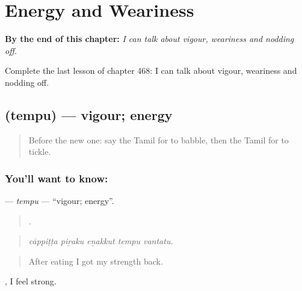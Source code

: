 
\chapter{Energy and Weariness}
\label{ch:ta-energy-and-weariness}

\begin{chapteropening}
\textbf{By the end of this chapter:} \emph{I can talk about vigour, weariness and nodding off.}

Complete the last lesson of chapter 468: I can talk about vigour, weariness and nodding off.
\end{chapteropening}

\section[\texorpdfstring{\ta{தெம்பு} (tempu)}{தெம்பு (tempu)}]{ (tempu) — vigour; energy}

\label{lesson:TA-C468-tempu}



\begin{quote}
Before the new one: say the Tamil for to babble, then the Tamil for to tickle.
\end{quote}

\subsection*{You'll want to know: }
\textbf{} — \emph{tempu} — \textquotedblleft{}vigour; energy\textquotedblright{}.

\begin{quote}
    .
\end{quote}

\begin{quote}
\emph{cāppiṭṭa piṟaku eṉakkut tempu vantatu.}
\end{quote}

\begin{quote}
After eating I got my strength back.
\end{quote}

 , I feel strong.

